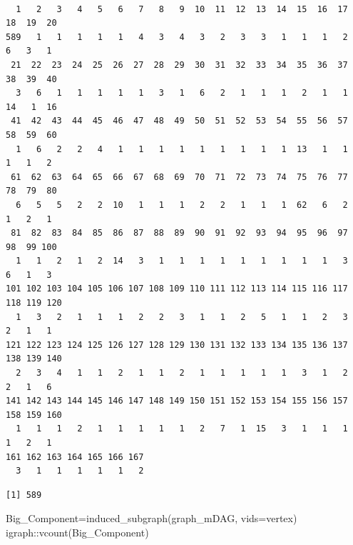 \documentclass[
  letterpaper,
  DIV=11,
  numbers=noendperiod]{scrreprt}
\newenvironment{Shaded}{\begin{snugshade}}{\end{snugshade}}
\newcommand{\AttributeTok}[1]{\textcolor[rgb]{0.40,0.45,0.13}{#1}}
\newcommand{\FunctionTok}[1]{\textcolor[rgb]{0.28,0.35,0.67}{#1}}
\newcommand{\NormalTok}[1]{\textcolor[rgb]{0.00,0.23,0.31}{#1}}
\newcommand{\OtherTok}[1]{\textcolor[rgb]{0.00,0.23,0.31}{#1}}
\newcommand{\SpecialCharTok}[1]{\textcolor[rgb]{0.37,0.37,0.37}{#1}}
\begin{document}
\begin{verbatim}

  1   2   3   4   5   6   7   8   9  10  11  12  13  14  15  16  17  18  19  20 
589   1   1   1   1   1   4   3   4   3   2   3   3   1   1   1   2   6   3   1 
 21  22  23  24  25  26  27  28  29  30  31  32  33  34  35  36  37  38  39  40 
  3   6   1   1   1   1   1   3   1   6   2   1   1   1   2   1   1  14   1  16 
 41  42  43  44  45  46  47  48  49  50  51  52  53  54  55  56  57  58  59  60 
  1   6   2   2   4   1   1   1   1   1   1   1   1   1  13   1   1   1   1   2 
 61  62  63  64  65  66  67  68  69  70  71  72  73  74  75  76  77  78  79  80 
  6   5   5   2   2  10   1   1   1   2   2   1   1   1  62   6   2   1   2   1 
 81  82  83  84  85  86  87  88  89  90  91  92  93  94  95  96  97  98  99 100 
  1   1   2   1   2  14   3   1   1   1   1   1   1   1   1   1   3   6   1   3 
101 102 103 104 105 106 107 108 109 110 111 112 113 114 115 116 117 118 119 120 
  1   3   2   1   1   1   2   2   3   1   1   2   5   1   1   2   3   2   1   1 
121 122 123 124 125 126 127 128 129 130 131 132 133 134 135 136 137 138 139 140 
  2   3   4   1   1   2   1   1   2   1   1   1   1   1   3   1   2   2   1   6 
141 142 143 144 145 146 147 148 149 150 151 152 153 154 155 156 157 158 159 160 
  1   1   1   2   1   1   1   1   1   2   7   1  15   3   1   1   1   1   2   1 
161 162 163 164 165 166 167 
  3   1   1   1   1   1   2 
\end{verbatim}

\begin{Shaded}
\end{Shaded}

\begin{verbatim}
[1] 589
\end{verbatim}

\begin{Shaded}
\begin{Highlighting}[]
\NormalTok{Big\_Component}\OtherTok{=}\FunctionTok{induced\_subgraph}\NormalTok{(graph\_mDAG, }\AttributeTok{vids=}\NormalTok{vertex)}
\NormalTok{igraph}\SpecialCharTok{::}\FunctionTok{vcount}\NormalTok{(Big\_Component)}
\end{Highlighting}
\end{Shaded}
\end{document}
